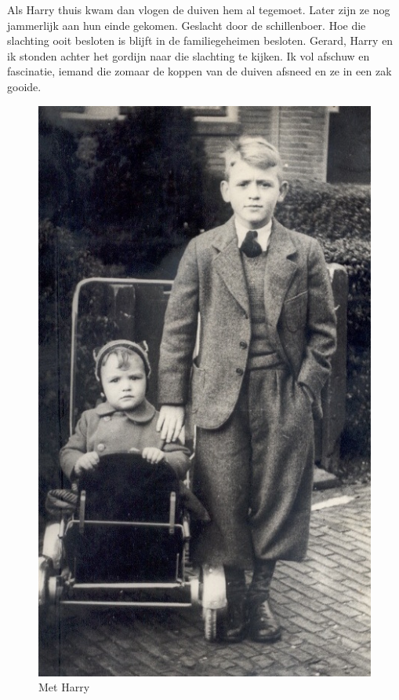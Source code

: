 \documentclass[10pt,twoside, openright]{memoir}
\begin{document}
Als Harry thuis kwam dan vlogen de duiven hem al tegemoet. Later zijn ze nog jammerlijk aan hun einde gekomen. Geslacht door de schillenboer. Hoe die slachting ooit besloten is blijft in de familiegeheimen besloten. Gerard, Harry en ik stonden achter het gordijn naar die slachting te kijken. Ik vol afschuw en fascinatie, iemand die zomaar de koppen van de duiven afsneed en ze in een zak gooide.

\begin{figure}
\includegraphics[width=\textwidth]{img/ch5/RuudHarry2}
\caption*{\footnotesize Met Harry}
\end{figure}
\end{document}
